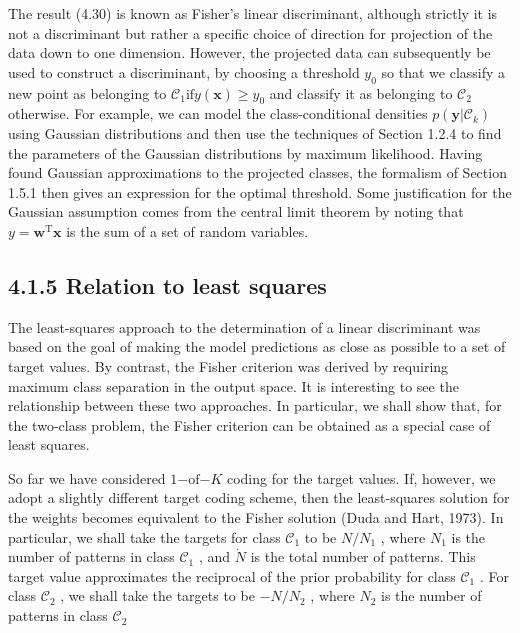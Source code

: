 \documentclass[
  10
]{article}
\begin{document}
The result (4.30) is known as Fisher's linear discriminant, although
strictly it is not a discriminant but rather a specific choice of
direction for projection of the data down to one dimension. However, the
projected data can subsequently be used to construct a discriminant, by
choosing a threshold \(y _ { 0 }\) so that we classify a new point as
belonging to
\(\mathcal { C } _ { 1 } \mathrm { i f } y ( \mathbf { x } ) \geqslant y _ { 0 }\)
and classify it as belonging to \(\mathcal { C } _ { 2 }\) otherwise.
For example, we can model the class-conditional densities
\(p ( \boldsymbol { y } | \mathcal { C } _ { k } )\) using Gaussian
distributions and then use the techniques of Section 1.2.4 to find the
parameters of the Gaussian distributions by maximum likelihood. Having
found Gaussian approximations to the projected classes, the formalism of
Section 1.5.1 then gives an expression for the optimal threshold. Some
justification for the Gaussian assumption comes from the central limit
theorem by noting that
\(y = \mathbf { w } ^ { \mathrm { T } } \mathbf { x }\) is the sum of a
set of random variables.

\subsection{4.1.5 Relation to least
squares}\label{relation-to-least-squares}

The least-squares approach to the determination of a linear discriminant
was based on the goal of making the model predictions as close as
possible to a set of target values. By contrast, the Fisher criterion
was derived by requiring maximum class separation in the output space.
It is interesting to see the relationship between these two approaches.
In particular, we shall show that, for the two-class problem, the Fisher
criterion can be obtained as a special case of least squares.

So far we have considered
\(1 { \mathrm { - o f } } { \mathrm { - } } K\) coding for the target
values. If, however, we adopt a slightly different target coding scheme,
then the least-squares solution for the weights becomes equivalent to
the Fisher solution (Duda and Hart, 1973). In particular, we shall take
the targets for class \(\mathcal { C } _ { 1 }\) to be \(N / N _ { 1 }\)
, where \(N _ { 1 }\) is the number of patterns in class
\(\mathcal { C } _ { 1 }\) , and \(\dot { N }\) is the total number of
patterns. This target value approximates the reciprocal of the prior
probability for class \(\mathcal { C } _ { 1 }\) . For class
\(\mathcal { C } _ { 2 }\) , we shall take the targets to be
\(- N / N _ { 2 }\) , where \(N _ { 2 }\) is the number of patterns in
class \(\mathcal { C } _ { 2 }\)
\end{document}
